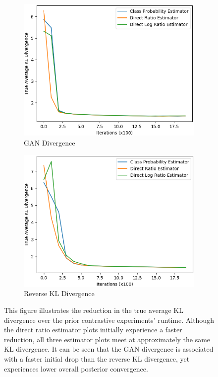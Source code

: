 \documentclass[honours,12pt, twoside]{unswthesis}
\numberwithin{equation}{section}
\theoremstyle{definition}
\begin{document}
\begin{figure}[h]
\begin{subfigure}{0.49\textwidth}
\includegraphics[width=\linewidth]{part2truklmins/PCADVvsPCADVexpvsPCADVgudlog.png}
\caption{GAN Divergence}
\end{subfigure}
\begin{subfigure}{0.49\textwidth}
\includegraphics[width=\linewidth]{part2truklmins/PCKLDvsPCKLexpvsPCKLgudlog.png}
\caption{Reverse KL Divergence}
\end{subfigure}
\caption{\small This figure illustrates the reduction in the true average KL divergence over the prior contrastive experiments' runtime. Although the direct ratio estimator plots initially experience a faster reduction, all three estimator plots meet at approximately the same KL divergence. It can be seen that the GAN divergence is associated with a faster initial drop than the reverse KL divergence, yet experiences lower overall posterior convergence.}
\end{figure}
\end{document}
